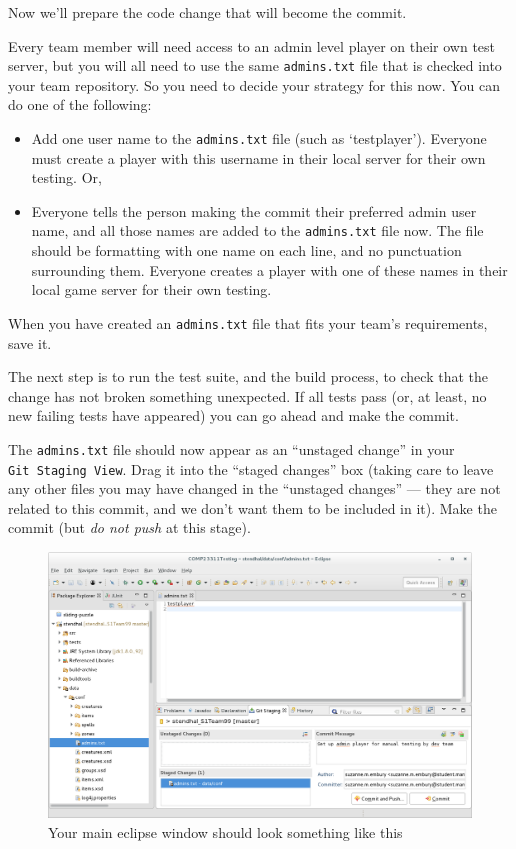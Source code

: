 \documentclass[
]{book}
\providecommand{\tightlist}{%
  \setlength{\itemsep}{0pt}\setlength{\parskip}{0pt}}
\begin{document}
Now we'll prepare the code change that will become the commit.

Every team member will need access to an admin level player on their own test server, but you will all need to use the same \texttt{admins.txt} file that is checked into your team repository. So you need to decide your strategy for this now. You can do one of the following:

\begin{itemize}
\tightlist
\item
  Add one user name to the \texttt{admins.txt} file (such as `testplayer'). Everyone must create a player with this username in their local server for their own testing. Or,
\item
  Everyone tells the person making the commit their preferred admin user name, and all those names are added to the \texttt{admins.txt} file now. The file should be formatting with one name on each line, and no punctuation surrounding them. Everyone creates a player with one of these names in their local game server for their own testing.
\end{itemize}

When you have created an \texttt{admins.txt} file that fits your team's requirements, save it.

The next step is to run the test suite, and the build process, to check that the change has not broken something unexpected. If all tests pass (or, at least, no new failing tests have appeared) you can go ahead and make the commit.

The \texttt{admins.txt} file should now appear as an ``unstaged change'' in your \texttt{Git\ Staging\ View}. Drag it into the ``staged changes'' box (taking care to leave any other files you may have changed in the ``unstaged changes'' --- they are not related to this commit, and we don't want them to be included in it). Make the commit (but \emph{do not push} at this stage).

\begin{figure}

{\centering \includegraphics[width=1\linewidth]{images/fileStagedForCommit} 

}

\caption{Your main eclipse window should look something like this}\label{fig:fileStagedForCommit-fig}
\end{figure}
\end{document}

